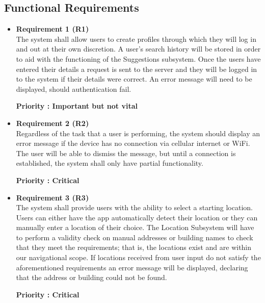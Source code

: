 \documentclass[english]{article}
\begin{document}
				\subsection{Functional Requirements}
					\begin{itemize}
					\subsubsection{Requirements}
					    \item \textbf{Requirement 1 (R1)}\\ The system shall allow users to create profiles through which they will log in and out at their own discretion. A user's search history will be stored in order to aid with the functioning of the Suggestions subsystem. Once the users have entered their details a request is sent to the server and they will be logged in to the system if their details were correct. An error message will need to be displayed, should authentication fail. \\ 
						\begin{small}
						\textbf{Priority : Important but not vital}
						\end{small}											    
					    
					   
					    \item \textbf{Requirement 2 (R2)}\\ Regardless of the task that a user is performing, the system should display an error message if the device has no connection via cellular internet or WiFi. The user will be able to dismiss the message, but until a connection is established, the system shall only have partial functionality. \\ 
						\begin{small}
						\textbf{Priority : Critical}
						\end{small}											    
					    
					  
					    \item \textbf{Requirement 3 (R3)}\\ The system shall provide users with the ability to select a starting location. Users can either have the app automatically detect their location or they can manually enter a location of their choice. The Location Subsystem will have to perform a validity check on manual addresses or building names to check that they meet the requirements; that is, the locations exist and are within our navigational scope. If locations received from user input do not satisfy the aforementioned requirements an error message will be displayed, declaring that the address or building could not be found. \\ 
						\begin{small}
						\textbf{Priority : Critical}
						\end{small}											    
					    


\end{itemize}
\end{document}

